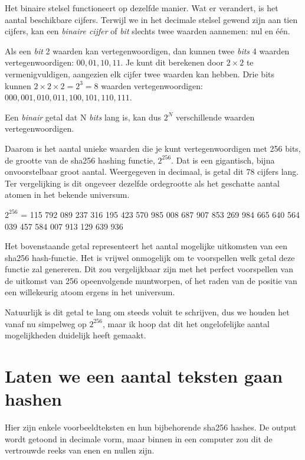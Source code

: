 Het binaire stelsel functioneert op dezelfde manier. Wat er verandert, is het aantal beschikbare cijfers. Terwijl we in het decimale stelsel gewend zijn aan tien cijfers, kan een \textit{binaire cijfer} of \textit{bit} slechts twee waarden aannemen: nul en één.

Als een \textit{bit} 2 waarden kan vertegenwoordigen, dan kunnen twee \textit{bits} 4 waarden vertegenwoordigen: $00, 01, 10, 11$. Je kunt dit berekenen door $2 \times 2$ te vermenigvuldigen, aangezien elk cijfer twee waarden kan hebben. Drie bits kunnen $2 \times 2 \times 2 = 2^3 = 8$ waarden vertegenwoordigen:  $000, 001, 010, 011, 100, 101, 110, 111$.

Een \textit{binair} getal dat N \textit{bits} lang is, kan dus $2^N$ verschillende waarden vertegenwoordigen.

Daarom is het aantal unieke waarden die je kunt vertegenwoordigen met 256 bits, de grootte van de sha256 hashing functie, $2^{256}$. Dat is een gigantisch, bijna onvoorstelbaar groot aantal. Weergegeven in decimaal, is getal dit 78 cijfers lang. Ter vergelijking is dit ongeveer dezelfde ordegrootte als het geschatte aantal atomen in het bekende universum.

  \vspace{\baselineskip}
$2^{256}$ = 115 792 089 237 316 195 423 570 985 008 687 907 853 269 984 665 640 564 039 457 584 007 913 129 639 936
\vspace{\baselineskip} 

Het bovenstaande getal representeert het aantal mogelijke uitkomsten van een sha256 hash-functie. Het is vrijwel onmogelijk om te voorspellen welk getal deze functie zal genereren. Dit zou vergelijkbaar zijn met het perfect voorspellen van de uitkomst van 256 opeenvolgende muntworpen, of het raden van de positie van een willekeurig atoom ergens in het universum.

Natuurlijk is dit getal te lang om steeds voluit te schrijven, dus we houden het vanaf nu simpelweg op $2^{256}$, maar ik hoop dat dit het ongelofelijke aantal mogelijkheden duidelijk heeft gemaakt.


\section{Laten we een aantal teksten gaan hashen}

Hier zijn enkele voorbeeldteksten en hun bijbehorende sha256 hashes. De output wordt getoond in decimale vorm, maar binnen in een computer zou dit de vertrouwde reeks van enen en nullen zijn.

